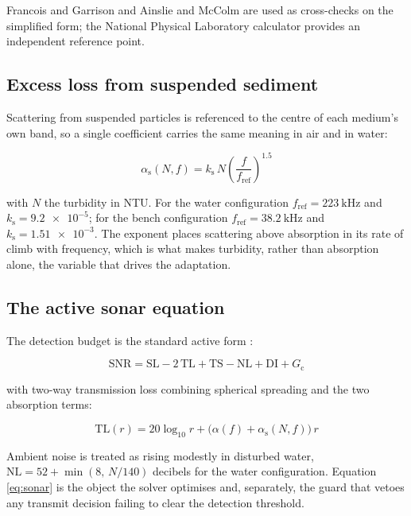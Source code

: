 \documentclass[conference,a4paper]{IEEEtran}
\begin{document}
Francois and Garrison \cite{francois1982} and Ainslie and McColm
\cite{ainslie1998} are used as cross-checks on the simplified form; the
National Physical Laboratory calculator \cite{npl} provides an independent
reference point.

\subsection{Excess loss from suspended sediment}

Scattering from suspended particles is referenced to the centre of each
medium's own band, so a single coefficient carries the same meaning in air and
in water:

\begin{equation}
\alpha_{\text{s}}(N,f) = k_{\text{s}}\,N
  \left(\frac{f}{f_{\text{ref}}}\right)^{1.5}
\label{eq:scatter}
\end{equation}

with $N$ the turbidity in NTU. For the water configuration
$f_{\text{ref}} = \SI{223}{\kilo\hertz}$ and
$k_{\text{s}} = \num{9.2e-5}$; for the bench configuration
$f_{\text{ref}} = \SI{38.2}{\kilo\hertz}$ and $k_{\text{s}} = \num{1.51e-3}$.
The exponent places scattering above absorption in its rate of climb with
frequency, which is what makes turbidity, rather than absorption alone, the
variable that drives the adaptation.

\subsection{The active sonar equation}

The detection budget is the standard active form \cite{urick1983}:

\begin{equation}
\mathrm{SNR} = \mathrm{SL} - 2\,\mathrm{TL} + \mathrm{TS}
             - \mathrm{NL} + \mathrm{DI} + G_{\text{c}}
\label{eq:sonar}
\end{equation}

with two-way transmission loss combining spherical spreading and the two
absorption terms:

\begin{equation}
\mathrm{TL}(r) = 20\log_{10} r + \bigl(\alpha(f) + \alpha_{\text{s}}(N,f)\bigr)\,r
\label{eq:tl}
\end{equation}

Ambient noise is treated as rising modestly in disturbed water,
$\mathrm{NL} = 52 + \min(8,\,N/140)$ decibels for the water configuration.
Equation \eqref{eq:sonar} is the object the solver optimises and, separately,
the guard that vetoes any transmit decision failing to clear the detection
threshold.
\end{document}
